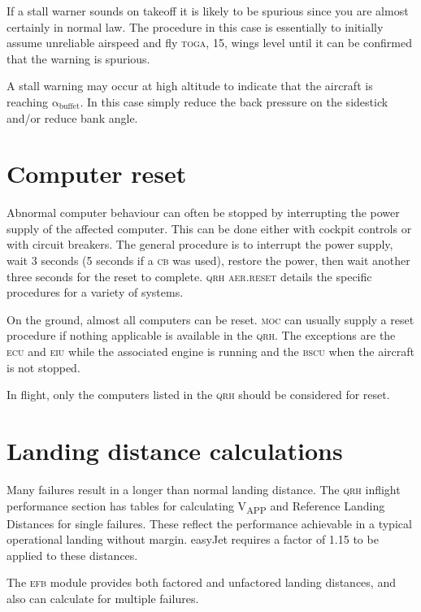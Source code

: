 \documentclass[a5paper,11pt,twoside]{book}
\newcommand{\ac}[1]{{\scshape\MakeLowercase{#1}}}
\newcommand{\inlcite}[1]{{\ac{#1}}}
\newcommand{\multicite}[1]{%
  \nopagebreak
  \noindent{{\color{blue}\footnotesize[ \inlcite{#1} ]}}
}
\newcommand{\V}[1]{V\textsubscript{#1}}
\begin{document}
If a stall warner sounds on takeoff it is likely to be spurious since you are
almost certainly in normal law. The procedure in this case is essentially to
initially assume unreliable airspeed and fly \ac{TOGA}, 15\textdegree , wings level
until it can be confirmed that the warning is spurious.

A stall warning may occur at high altitude to indicate that the aircraft is
reaching $\mathrm{\alpha_{buffet}}$. In this case simply reduce the back
pressure on the sidestick and/or reduce bank angle.

\multicite{FCOM~PRO.AER.MISC}


\section{Computer reset}

Abnormal computer behaviour can often be stopped by interrupting the power
supply of the affected computer. This can be done either with cockpit controls
or with circuit breakers. The general procedure is to interrupt the power
supply, wait 3 seconds (5 seconds if a \ac{CB} was used), restore the power,
then wait another three seconds for the reset to complete. \inlcite{QRH
  AER.RESET} details the specific procedures for a variety of systems.

On the ground, almost all computers can be reset. \ac{MOC} can usually supply a
reset procedure if nothing applicable is available in the \ac{QRH}. The
exceptions are the \ac{ECU} and \ac{EIU} while the associated engine is running
and the \ac{BSCU} when the aircraft is not stopped.

In flight, only the computers listed in the \ac{QRH} should be considered for
reset.

\multicite{QRH~AER.SYSTEM~RESET}

\section{Landing distance calculations}

Many failures result in a longer than normal landing distance. The \ac{QRH}
inflight performance section has tables for calculating \V{APP} and Reference
Landing Distances for single failures. These reflect the performance achievable
in a typical operational landing without margin. easyJet requires a factor of
1.15 to be applied to these distances.

The \ac{EFB} module provides both factored and unfactored landing distances, and
also can calculate for multiple failures.
\end{document}
